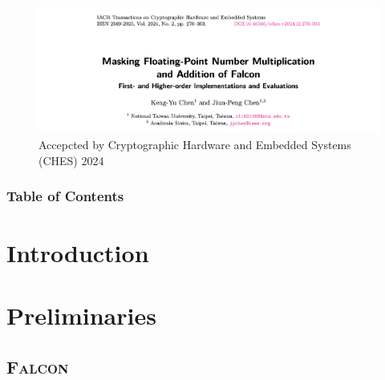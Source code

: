 

\usepackage[
    backend=biber,
    style=alphabetic,
    sorting=ynt
]{biblatex}


\renewcommand*{\bibfont}{\scriptsize}





\begin{frame}
\maketitle
\end{frame}


\begin{frame}
\begin{figure}
	\includegraphics[width=\textwidth]{Figure/paper_title.png}
	\caption*{Accepcted by Cryptographic Hardware and Embedded Systems (CHES) 2024}
\end{figure}
\end{frame}



\begin{frame}
\frametitle{Table of Contents}
\tableofcontents[hideothersubsections]

\end{frame}


\section{Introduction}




\section{Preliminaries}

\subsection{\textsc{Falcon}}


